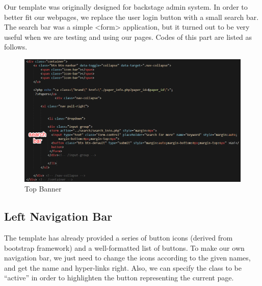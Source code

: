 \documentclass{book}
\begin{document}
Our template was originally designed for backstage admin system. In order to better fit our webpages, we replace the user login button with a small search bar. The search bar was a simple <form> application, but it turned out to be very useful when we are testing and using our pages. Codes of this part are listed as follows.

\begin{figure}[H]
\centering{}
\includegraphics[scale=0.35]{img/zlt_beau_codes.png}
\caption{Top Banner}
\end{figure}


\subsection {Left Navigation Bar}

The template has already provided a series of button icons (derived from bootstrap framework) and a well-formatted list of buttons. To make our own navigation bar, we just need to change the icons according to the given names, and get the name and hyper-links right. Also, we can specify the class to be ``active'' in order to highlighten the button representing the current page.
\end{document}
